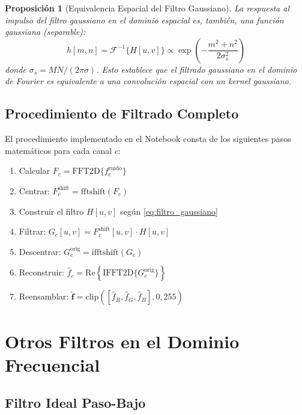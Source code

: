 \documentclass[conference]{IEEEtran}
\newtheorem{proposicion}{Proposición}
\begin{document}
\begin{proposicion}[Equivalencia Espacial del Filtro Gaussiano]
  \label{prop:conv_gauss}
  La respuesta al impulso del filtro gaussiano en el dominio espacial es,
  también, una función gaussiana (separable):
  \begin{equation}
    h[m,n] = \mathcal{F}^{-1}\{H[u,v]\}
           \propto \exp\!\left(-\frac{m^2+n^2}{2\sigma_s^2}\right)
    \label{eq:resp_impulso}
  \end{equation}
  donde $\sigma_s = MN/(2\pi\sigma)$. Esto establece que el filtrado
  gaussiano en el dominio de Fourier es equivalente a una convolución
  espacial con un kernel gaussiano.
\end{proposicion}

\subsection{Procedimiento de Filtrado Completo}

El procedimiento implementado en el Notebook consta de los siguientes pasos
matemáticos para cada canal $c$:

\begin{enumerate}
  \item Calcular $F_c = \mathrm{FFT2D}\{f_c^{\text{ruido}}\}$
  \item Centrar: $F_c^{\text{shift}} = \mathrm{fftshift}(F_c)$
  \item Construir el filtro $H[u,v]$ según \eqref{eq:filtro_gaussiano}
  \item Filtrar: $G_c[u,v] = F_c^{\text{shift}}[u,v]\cdot H[u,v]$
  \item Descentrar: $G_c^{\text{orig}} = \mathrm{ifftshift}(G_c)$
  \item Reconstruir: $\hat{f}_c = \mathrm{Re}\!\left\{\mathrm{IFFT2D}\{G_c^{\text{orig}}\}\right\}$
  \item Reensamblar: $\hat{\mathbf{f}} = \mathrm{clip}\!\left([\hat{f}_R,\hat{f}_G,\hat{f}_B],0,255\right)$
\end{enumerate}

\section{Otros Filtros en el Dominio Frecuencial}
\label{sec:filtros_adicionales}

\subsection{Filtro Ideal Paso-Bajo}
\end{document}
